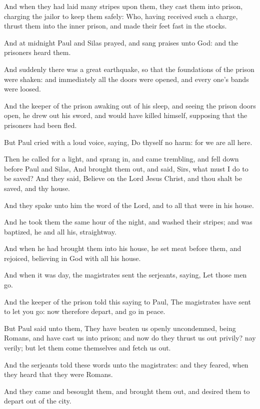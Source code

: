 \Verse And when they had laid many stripes upon them, they cast them into prison, charging the jailor to keep them safely: \Verse Who, having received such a charge, thrust them into the inner prison, and made their feet fast in the stocks.

\Verse And at midnight Paul and Silas prayed, and sang praises unto God: and the prisoners heard them.

\Verse And suddenly there was a great earthquake, so that the foundations of the prison were shaken: and immediately all the doors were opened, and every one's bands were loosed.

\Verse And the keeper of the prison awaking out of his sleep, and seeing the prison doors open, he drew out his sword, and would have killed himself, supposing that the prisoners had been fled.

\Verse But Paul cried with a loud voice, saying, Do thyself no harm: for we are all here.

\Verse Then he called for a light, and sprang in, and came trembling, and fell down before Paul and Silas, \Verse And brought them out, and said, Sirs, what must I do to be saved?  \Verse And they said, Believe on the Lord Jesus Christ, and thou shalt be saved, and thy house.

\Verse And they spake unto him the word of the Lord, and to all that were in his house.

\Verse And he took them the same hour of the night, and washed their stripes; and was baptized, he and all his, straightway.

\Verse And when he had brought them into his house, he set meat before them, and rejoiced, believing in God with all his house.

\Verse And when it was day, the magistrates sent the serjeants, saying, Let those men go.

\Verse And the keeper of the prison told this saying to Paul, The magistrates have sent to let you go: now therefore depart, and go in peace.

\Verse But Paul said unto them, They have beaten us openly uncondemned, being Romans, and have cast us into prison; and now do they thrust us out privily? nay verily; but let them come themselves and fetch us out.

\Verse And the serjeants told these words unto the magistrates: and they feared, when they heard that they were Romans.

\Verse And they came and besought them, and brought them out, and desired them to depart out of the city.

